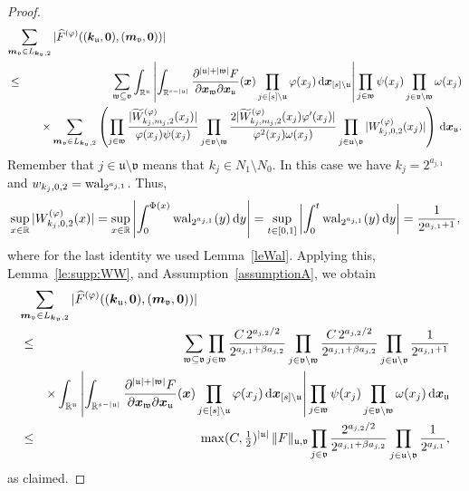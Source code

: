 \documentclass[namedate,webpdf,imanum]{ima-authoring-arxiv}%
\theoremstyle{thmstyletwo}%
\numberwithin{equation}{section}
\newcommand{\rd}{\, {\rm d}}
\newcommand{\wal}{{\rm wal}}
\newcommand{\bsx}{\boldsymbol{x}}
\newcommand{\bsk}{\boldsymbol{k}}
\newcommand{\bsm}{\boldsymbol{m}}
\newcommand{\bszero}{\boldsymbol{0}}
\newcommand{\uu}{\mathfrak{u}}
\newcommand{\vv}{\mathfrak{v}}
\newcommand{\ww}{\mathfrak{w}}
\newcommand{\RR}{\mathbb{R}}
\begin{document}
\begin{proof}
\begin{eqnarray*}%
\lefteqn{\sum_{\bsm_\vv \in L_{\bsk_\vv,2}} | \widehat{F}^{(\varphi)}((\bsk_\uu,\bszero),(\bsm_\vv,\bszero))| } \nonumber \\
& \le & \sum_{\ww \subseteq \vv}    \int_{\mathbb{R}^{\uu}} \left| \int_{\mathbb{R}^{s-|\uu|}} \frac{\partial^{|\uu| + |\ww|} F}{\partial \bsx_\ww \partial \bsx_{\uu}}(\bsx)\prod_{j \in [s]\setminus \uu} \varphi(x_j) \rd \bsx_{[s] \setminus \uu} \right|  \prod_{j \in \ww} \psi(x_j) \prod_{j \in \vv \setminus \ww} \omega(x_j)   \nonumber \\
& & \quad \times \sum_{\bsm_\vv \in L_{\bsk_\vv,2}} \left(\prod_{j \in \ww} \frac{|\widetilde{W}_{k_j,m_j,2}^{(\varphi)}(x_j)|}{\varphi(x_j) \psi(x_j)} \prod_{j \in \vv \setminus \ww} \frac{2 |\widetilde{W}_{k_j,m_j,2}^{(\varphi)}(x_j) \varphi'(x_j)|}{\varphi^2(x_j) \omega(x_j)}  \prod_{j \in \uu \setminus \vv} |W^{(\varphi)}_{k_j, 0, 2}(x_j)|\right) \rd \bsx_{\uu}.
\end{eqnarray*}
Remember that $j \in \uu \setminus \vv$ means that $k_j \in N_1\setminus N_0$. In this case we have $k_j=2^{a_{j,1}}$ and $w_{k_j,0,2}=\wal_{2^{a_{j,1}}}$. Thus,
$$\sup_{x \in \RR}|W^{(\varphi)}_{k_j, 0, 2}(x)| =\sup_{x \in \RR}\left|\int_0^{\Phi(x)}\wal_{2^{a_{j,1}}}(y) \rd y \right|=\sup_{t \in [0,1]}\left|\int_0^t \wal_{2^{a_{j,1}}}(y) \rd y \right|=\frac{1}{2^{a_{j,1}+1}},$$ where for the last identity we used Lemma~\ref{leWal}. Applying this, Lemma~\ref{le:supp:WW}, and Assumption~\ref{assumptionA}, we obtain
\begin{eqnarray*}
\lefteqn{\sum_{\bsm_{\vv} \in L_{\bsk_{\vv}, 2}} | \widehat{F}^{(\varphi)}((\bsk_\uu,\bszero),(\bsm_\vv,\bszero))|}  \nonumber  \\
& \le &  \sum_{\ww \subseteq \vv} \prod_{j \in \ww} \frac{C\, 2^{a_{j,2}/2}}{2^{a_{j,1}+ \beta a_{j,2}}} \prod_{j \in \vv \setminus \ww}\frac{C\, 2^{a_{j,2}/2}}{2^{a_{j,1}+ \beta a_{j,2}}} \prod_{j \in \uu \setminus \vv} \frac{1}{2^{a_{j,1}+1}} \nonumber \\
& & \times \int_{\mathbb{R}^{\uu}} \left| \int_{\mathbb{R}^{s-|\uu|}} \frac{\partial^{|\uu| + |\ww|} F}{\partial \bsx_\ww \partial \bsx_{\uu}}(\bsx)\prod_{j \in [s]\setminus \uu} \varphi(x_j) \rd \bsx_{[s] \setminus \uu} \right|   \prod_{j \in \ww} \psi(x_j) \prod_{j \in \vv \setminus \ww} \omega(x_j)  \rd \bsx_{\uu} \nonumber  \\ 
& \le & \max(C,\tfrac{1}{2})^{|\uu|}\, \|F\|_{\uu, \vv} \prod_{j \in \vv} \frac{2^{a_{j,2}/2}}{2^{a_{j,1}+ \beta a_{j,2}}}  \prod_{j \in \uu \setminus \vv} \frac{1}{2^{a_{j,1}}},
\end{eqnarray*}
as claimed.
\end{proof}
\end{document}
